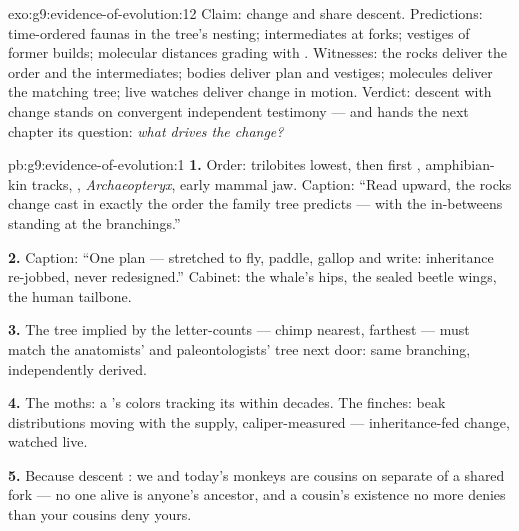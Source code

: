 \begin{solution}{exo:g9:evidence-of-evolution:12}
Claim:  change and share descent. Predictions:
time-ordered faunas in the tree's nesting; intermediates
at forks; vestiges of former builds; molecular distances
grading with . Witnesses: the rocks deliver the
order and the intermediates; bodies deliver plan and
vestiges; molecules deliver the matching tree; live
watches deliver change in motion. Verdict: descent with
change stands on convergent independent testimony ---
and hands the next chapter its question: \emph{what
drives the change?}
\end{solution}

\begin{solution}{pb:g9:evidence-of-evolution:1}
\textbf{1.} Order: trilobites lowest, then first ,
amphibian-kin tracks, , \emph{Archaeopteryx},
early mammal jaw. Caption: ``Read upward, the rocks
change cast in exactly the order the family tree
predicts --- with the in-betweens standing at the
branchings.''

\textbf{2.} Caption: ``One  plan --- stretched to
fly, paddle, gallop and write: inheritance re-jobbed,
never redesigned.'' Cabinet: the whale's hips, the sealed
beetle wings, the human tailbone.

\textbf{3.} The tree implied by the letter-counts ---
chimp nearest,  farthest --- must match the
anatomists' and paleontologists' tree next door: same
branching, independently derived.

\textbf{4.} The moths: a 's colors tracking its
 within decades. The finches: beak
distributions moving with the  supply, caliper-measured
--- inheritance-fed change, watched live.

\textbf{5.} Because descent : we and today's
monkeys are cousins on separate  of a shared
fork --- no one alive is anyone's ancestor, and a
cousin's existence no more denies  than your
cousins deny yours.


\end{solution}
